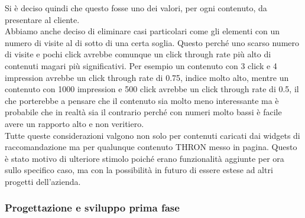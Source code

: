 \documentclass[a4paper, 12pt, twoside, openright]{book}
\begin{document}
Si è deciso quindi che questo fosse uno dei valori, per ogni contenuto, da presentare al cliente.\\
Abbiamo anche deciso di eliminare casi particolari come gli elementi con un numero di visite al di sotto di una certa soglia. Questo perché uno scarso numero di visite e pochi click avrebbe comunque un click through rate più alto di contenuti magari più significativi. Per esempio un contenuto con 3 click e 4 impression avrebbe un click through rate di 0.75, indice molto alto, mentre un contenuto con 1000 impression e 500 click avrebbe un click through rate di 0.5, il che porterebbe a pensare che il contenuto sia molto meno interessante ma è probabile che in realtà sia il contrario perché con numeri molto bassi è facile avere un rapporto alto e non veritiero.\\
Tutte queste considerazioni valgono non solo per contenuti caricati dai widgets di raccomandazione ma per qualunque contenuto THRON messo in pagina. Questo è stato motivo di ulteriore stimolo poiché erano funzionalità aggiunte per ora sullo specifico caso, ma con la possibilità in futuro di essere estese ad altri progetti dell'azienda.

\subsubsection{Progettazione e sviluppo prima fase}
\end{document}

